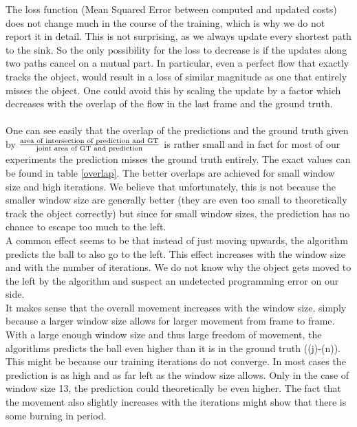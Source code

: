 \documentclass{article}
\begin{document}
The loss function (Mean Squared Error between computed and updated costs) does not change much in the course of the training, which is why we do not report it in detail. This is not surprising, as we always update every shortest path to the sink. So the only possibility for the loss to decrease is if the updates along two paths cancel on a mutual part. In particular, even a perfect flow that exactly tracks the object, would result in a loss of similar magnitude as one that entirely misses the object. One could avoid this by scaling the update by a factor which decreases with the overlap of the flow in the last frame and the ground truth.\\
\\
One can see easily that the overlap of the predictions and the ground truth given by $\frac{\textnormal{area of intersection of prediction and GT}}{\textnormal{joint area of GT and prediction}}$ is rather small and in fact for most of our experiments the prediction misses the ground truth entirely. The exact values can be found in table \ref{overlap}. The better overlaps are achieved for small window size and high iterations. We believe that unfortunately, this is not because the smaller window size are generally better (they are even too small to theoretically track the object correctly) but since for small window sizes, the prediction has no chance to escape too much to the left.
\\
A common effect seems to be that instead of just moving upwards, the algorithm predicts the ball to also go to the left. This effect increases with the window size and with the number of iterations. We do not know why the object gets moved to the left by the algorithm and suspect an undetected programming error on our side.\\
It makes sense that the overall movement increases with the window size, simply because a larger window size allows for larger movement from frame to frame. With a large enough window size and thus large freedom of movement, the algorithms predicts the ball even higher than it is in the ground truth ((j)-(n)). This might be because our training iterations do not converge. In most cases the prediction is as high and as far left as the window size allows. Only in the case of window size 13, the prediction could theoretically be even higher. The fact that the movement also slightly increases with the iterations might show that there is some burning in period.
\end{document}
